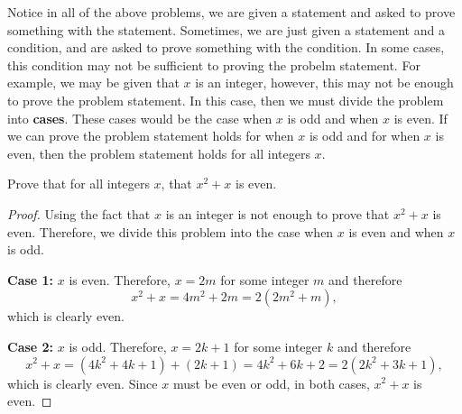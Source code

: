 Notice in all of the above problems, we are given a statement and asked to prove something with the statement.  Sometimes, we are just given a statement and a condition, and are asked to prove something with the condition.  In some cases, this condition may not be sufficient to proving the probelm statement.  For example, we may be given that $x$ is an integer, however, this may not be enough to prove the problem statement.  In this case, then we must divide the problem into \textbf{cases}.  These cases would be the case when $x$ is odd and when $x$ is even.  If we can prove the problem statement holds for when $x$ is odd and for when $x$ is even, then the problem statement holds for all integers $x$.
\begin{exmp}  Prove that for all integers $x$, that $x^2+x$ is even.  \end{exmp}
\begin{proof}
Using the fact that $x$ is an integer is not enough to prove that $x^2+x$ is even.  Therefore, we divide this problem into the case when $x$ is even and when $x$ is odd.  

\textbf{Case 1:}  $x$ is even.  Therefore, $x=2m$ for some integer $m$ and therefore $$x^2+x=4m^2+2m=2(2m^2+m),$$ which is clearly even.

\textbf{Case 2:}  $x$ is odd.  Therefore, $x=2k+1$ for some integer $k$ and therefore $$x^2+x=(4k^2+4k+1)+(2k+1)=4k^2+6k+2=2(2k^2+3k+1),$$ which is clearly even.  
Since $x$ must be even or odd, in both cases, $x^2+x$ is even. \end{proof}


